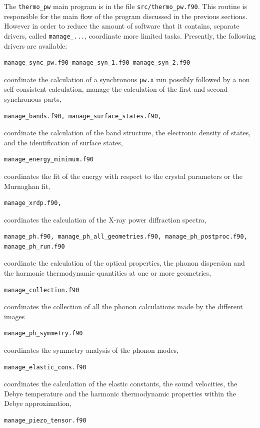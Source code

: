 \documentclass[12pt,a4paper,twoside]{report}
\begin{document}
The \texttt{thermo\_pw} main program is in the file \texttt{src/thermo\_pw.f90}.
This routine is responsible for the main flow of the program discussed
in the previous sections. However in order to reduce the amount of
software that it contains, separate drivers, called 
\texttt{manage\_...},  coordinate more limited tasks.
Presently, the following drivers are available:
\begin{verbatim}
manage_sync_pw.f90 manage_syn_1.f90 manage_syn_2.f90
\end{verbatim}
coordinate the calculation of a synchronous \texttt{pw.x} run possibly 
followed by a non self consistent calculation, manage the calculation of 
the first and second synchronous parts,
\begin{verbatim}
manage_bands.f90, manage_surface_states.f90,      
\end{verbatim}
coordinate the calculation of the band structure, the electronic density
of states, and the identification of surface states,
\begin{verbatim}
manage_energy_minimum.f90      
\end{verbatim}
coordinates the fit of the energy with respect to the crystal parameters
or the Murnaghan fit,
\begin{verbatim}
manage_xrdp.f90,                
\end{verbatim}
coordinates the calculation of the X-ray power diffraction spectra,
\begin{verbatim}
manage_ph.f90, manage_ph_all_geometries.f90, manage_ph_postproc.f90,
manage_ph_run.f90      
\end{verbatim}
coordinate the calculation of the optical properties, the phonon dispersion
and the harmonic thermodynamic quantities at one or more geometries,
\begin{verbatim}
manage_collection.f90
\end{verbatim}
coordinates the collection of all the phonon calculations made by the 
different images
\begin{verbatim}
manage_ph_symmetry.f90
\end{verbatim}
coordinates the symmetry analysis of the phonon modes,
\begin{verbatim}
manage_elastic_cons.f90  
\end{verbatim}
coordinates the calculation of the elastic constants, the sound velocities,
the Debye temperature and the harmonic thermodynamic properties within the 
Debye approximation,
\begin{verbatim}
manage_piezo_tensor.f90  
\end{verbatim}
\end{document}
